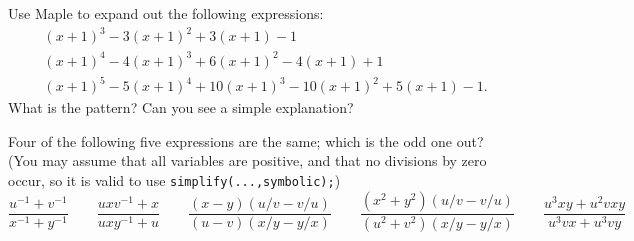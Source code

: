 \documentclass[a4paper,10pt]{amsbook}
\numberwithin{example}{chapter}
\begin{document}
\begin{exercise}\label{ex-expand-unshift}
 Use Maple to expand out the following expressions:
 \begin{align*}
  & (x+1)^3 - 3(x+1)^2 + 3(x+1) - 1 \\
  & (x+1)^4 - 4(x+1)^3 + 6(x+1)^2 - 4(x+1) + 1 \\
  & (x+1)^5 - 5(x+1)^4 + 10(x+1)^3 - 10(x+1)^2 + 5(x+1) - 1.
 \end{align*}
 What is the pattern?  Can you see a simple explanation?
\end{exercise}

\begin{exercise}\label{ex-oddone}
 Four of the following five expressions are the same; which is the odd
 one out?  (You may assume that all variables are positive, and that no
 divisions by zero occur, so it is valid to use
 \verb+simplify(...,symbolic);+)
 \[ 
  \frac{u^{-1}+v^{-1}}{x^{-1}+y^{-1}}            \hspace{2em}
  \frac{uxv^{-1} + x}{uxy^{-1} + u}              \hspace{2em}
  \frac{(x-y)(u/v-v/u)}{(u-v)(x/y-y/x)}          \hspace{2em}
  \frac{(x^2+y^2)(u/v-v/u)}{(u^2+v^2)(x/y-y/x)}  \hspace{2em}
  \frac{u^3xy+u^2vxy}{u^3vx+u^3vy}
 \]
\end{exercise}
\end{document}
